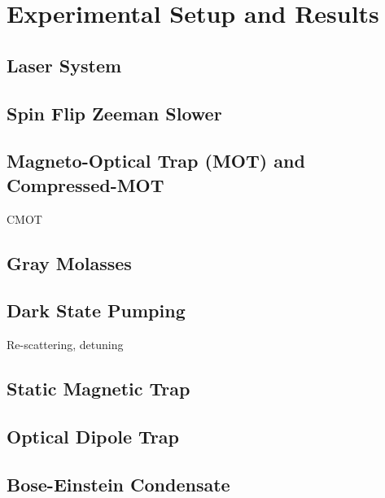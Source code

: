 \chapter{Experimental Setup and Results}

\section{Laser System}


\section{Spin Flip Zeeman Slower}

\section{Magneto-Optical Trap (MOT) and Compressed-MOT}

CMOT

\section{Gray Molasses}

\section{Dark State Pumping}

Re-scattering, detuning

\section{Static Magnetic Trap}

\section{Optical Dipole Trap}

\section{Bose-Einstein Condensate}
